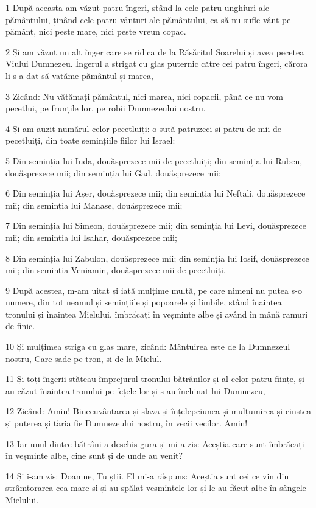 \par 1 După aceasta am văzut patru îngeri, stând la cele patru unghiuri ale pământului, ținând cele patru vânturi ale pământului, ca să nu sufle vânt pe pământ, nici peste mare, nici peste vreun copac.
\par 2 Și am văzut un alt înger care se ridica de la Răsăritul Soarelui și avea pecetea Viului Dumnezeu. Îngerul a strigat cu glas puternic către cei patru îngeri, cărora li s-a dat să vatăme pământul și marea,
\par 3 Zicând: Nu vătămați pământul, nici marea, nici copacii, până ce nu vom pecetlui, pe frunțile lor, pe robii Dumnezeului nostru.
\par 4 Și am auzit numărul celor pecetluiți: o sută patruzeci și patru de mii de pecetluiți, din toate semințiile fiilor lui Israel:
\par 5 Din seminția lui Iuda, douăsprezece mii de pecetluiți; din seminția lui Ruben, douăsprezece mii; din seminția lui Gad, douăsprezece mii;
\par 6 Din seminția lui Așer, douăsprezece mii; din seminția lui Neftali, douăsprezece mii; din seminția lui Manase, douăsprezece mii;
\par 7 Din seminția lui Simeon, douăsprezece mii; din seminția lui Levi, douăsprezece mii; din seminția lui Isahar, douăsprezece mii;
\par 8 Din seminția lui Zabulon, douăsprezece mii; din seminția lui Iosif, douăsprezece mii; din seminția Veniamin, douăsprezece mii de pecetluiți.
\par 9 După acestea, m-am uitat și iată mulțime multă, pe care nimeni nu putea s-o numere, din tot neamul și semințiile și popoarele și limbile, stând înaintea tronului și înaintea Mielului, îmbrăcați în veșminte albe și având în mână ramuri de finic.
\par 10 Și mulțimea striga cu glas mare, zicând: Mântuirea este de la Dumnezeul nostru, Care șade pe tron, și de la Mielul.
\par 11 Și toți îngerii stăteau împrejurul tronului bătrânilor și al celor patru ființe, și au căzut înaintea tronului pe fețele lor și s-au închinat lui Dumnezeu,
\par 12 Zicând: Amin! Binecuvântarea și slava și înțelepciunea și mulțumirea și cinstea și puterea și tăria fie Dumnezeului nostru, în vecii vecilor. Amin!
\par 13 Iar unul dintre bătrâni a deschis gura și mi-a zis: Aceștia care sunt îmbrăcați în veșminte albe, cine sunt și de unde au venit?
\par 14 Și i-am zis: Doamne, Tu știi. El mi-a răspuns: Aceștia sunt cei ce vin din strâmtorarea cea mare și și-au spălat veșmintele lor și le-au făcut albe în sângele Mielului.
